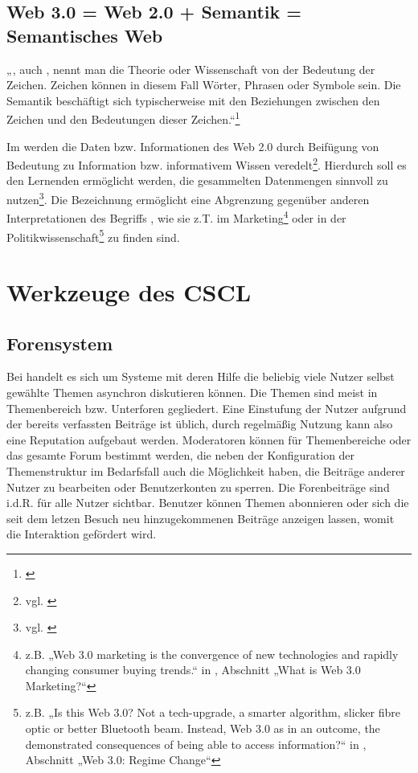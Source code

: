 \subsection{Web 3.0 = Web 2.0 + Semantik = Semantisches Web}

„, auch , nennt man die Theorie oder Wissenschaft von der Bedeutung der Zeichen. Zeichen können in diesem Fall Wörter, Phrasen oder Symbole sein. Die Semantik beschäftigt sich typischerweise mit den Beziehungen zwischen den Zeichen und den Bedeutungen dieser Zeichen.“\footnote{\cite{wp:semantik}}

Im  werden die Daten bzw. Informationen des Web 2.0 durch Beifügung von Bedeutung zu Information bzw. informativem Wissen veredelt\footnote{vgl. \cite{nyt:markoff}}. Hierdurch soll es den Lernenden ermöglicht werden, die gesammelten Datenmengen sinnvoll zu nutzen\footnote{vgl. \cite{tsp:tolksdorf}}. Die Bezeichnung  ermöglicht eine Abgrenzung gegenüber anderen Interpretationen des Begriffs , wie sie z.T. im Marketing\footnote{z.B. „Web 3.0 marketing is the convergence of new technologies and rapidly changing consumer buying trends.“ in \cite{web3market}, Abschnitt „What is Web 3.0 Marketing?“} oder in der Politikwissenschaft\footnote{z.B. „Is this Web 3.0? Not a tech-upgrade, a smarter algorithm, slicker fibre optic or better Bluetooth beam. Instead, Web 3.0 as in an outcome, the demonstrated consequences of being able to access information?“ in \cite{web3pol}, Abschnitt „Web 3.0: Regime Change“} zu finden sind.


\section{Werkzeuge des CSCL} %
\label{sec:werkzeuge_des_cscl}

\subsection{Forensystem} %
\label{sub:forensysteme}
Bei  handelt es sich um Systeme mit deren Hilfe die beliebig viele Nutzer selbst gewählte Themen asynchron diskutieren können. Die Themen sind meist in Themenbereich bzw. Unterforen gegliedert. Eine Einstufung der Nutzer aufgrund der bereits verfassten Beiträge ist üblich, durch regelmäßig Nutzung kann also eine Reputation aufgebaut werden. Moderatoren können für Themenbereiche oder das gesamte Forum bestimmt werden, die neben der Konfiguration der Themenstruktur im Bedarfsfall auch die Möglichkeit haben, die Beiträge anderer Nutzer zu bearbeiten oder Benutzerkonten zu sperren. Die Forenbeiträge sind i.d.R. für alle Nutzer sichtbar. Benutzer können Themen abonnieren oder sich die seit dem letzen Besuch neu hinzugekommenen Beiträge anzeigen lassen, womit die Interaktion gefördert wird.

